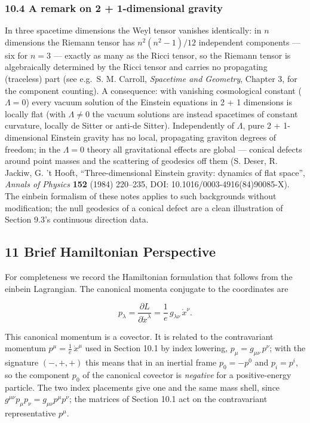 \documentclass[
]{article}
\begin{document}
\hypertarget{a-remark-on-2-1-dimensional-gravity}{%
\subsubsection{10.4 A remark on 2 + 1-dimensional
gravity}\label{a-remark-on-2-1-dimensional-gravity}}

In three spacetime dimensions the Weyl tensor vanishes identically: in
\(n\) dimensions the Riemann tensor has \(n^{2}(n^{2}-1)/12\)
independent components --- six for \(n = 3\) --- exactly as many as the
Ricci tensor, so the Riemann tensor is algebraically determined by the
Ricci tensor and carries no propagating (traceless) part (see e.g.~S. M.
Carroll, \emph{Spacetime and Geometry}, Chapter 3, for the component
counting). A consequence: with vanishing cosmological constant
(\(\Lambda = 0\)) every vacuum solution of the Einstein equations in 2 +
1 dimensions is locally flat (with \(\Lambda \neq 0\) the vacuum
solutions are instead spacetimes of constant curvature, locally de
Sitter or anti-de Sitter). Independently of \(\Lambda\), pure 2 +
1-dimensional Einstein gravity has no local, propagating graviton
degrees of freedom; in the \(\Lambda = 0\) theory all gravitational
effects are global --- conical defects around point masses and the
scattering of geodesics off them (S. Deser, R. Jackiw, G. 't Hooft,
``Three-dimensional Einstein gravity: dynamics of flat space'',
\emph{Annals of Physics} \textbf{152} (1984) 220--235, DOI:
10.1016/0003-4916(84)90085-X). The einbein formalism of these notes
applies to such backgrounds without modification; the null geodesics of
a conical defect are a clean illustration of Section 9.3's continuous
direction data.

\hypertarget{brief-hamiltonian-perspective}{%
\subsection{11 Brief Hamiltonian
Perspective}\label{brief-hamiltonian-perspective}}

For completeness we record the Hamiltonian formulation that follows from
the einbein Lagrangian. The canonical momenta conjugate to the
coordinates are

\[p_{\lambda} = \frac{\partial L}{\partial \dot{x}^{\lambda}} = \frac{1}{e}\, g_{\lambda\nu}\, \dot{x}^{\nu}. \tag{74}\]

This canonical momentum is a covector. It is related to the
contravariant momentum \(p^{\mu} = \frac{1}{e}\, \dot{x}^{\mu}\) used in
Section 10.1 by index lowering, \(p_{\mu} = g_{\mu\nu}\, p^{\nu}\); with
the signature \((-, +, +)\) this means that in an inertial frame
\(p_{0} = -p^{0}\) and \(p_{i} = p^{i}\), so the component \(p_{0}\) of
the canonical covector is \emph{negative} for a positive-energy
particle. The two index placements give one and the same mass shell,
since \(g^{\mu\nu} p_{\mu} p_{\nu} = g_{\mu\nu} p^{\mu} p^{\nu}\); the
matrices of Section 10.1 act on the contravariant representative
\(p^{\mu}\).
\end{document}
